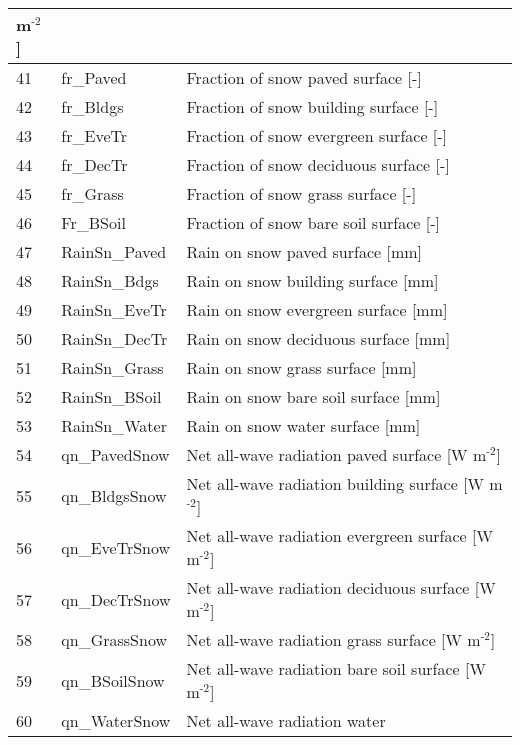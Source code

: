 \documentclass[letterpaper,10pt,english]{sphinxmanual}
\begin{document}
\begin{savenotes}
\begin{longtable}{|l|l|l|}
m$^{\text{-2}}${]}
\\
\hline
41
&
fr\_Paved
&
Fraction of snow \textendash{}
paved surface {[}-{]}
\\
\hline
42
&
fr\_Bldgs
&
Fraction of snow \textendash{}
building surface {[}-{]}
\\
\hline
43
&
fr\_EveTr
&
Fraction of snow \textendash{}
evergreen surface {[}-{]}
\\
\hline
44
&
fr\_DecTr
&
Fraction of snow \textendash{}
deciduous surface {[}-{]}
\\
\hline
45
&
fr\_Grass
&
Fraction of snow \textendash{}
grass surface {[}-{]}
\\
\hline
46
&
Fr\_BSoil
&
Fraction of snow \textendash{}
bare soil surface {[}-{]}
\\
\hline
47
&
RainSn\_Paved
&
Rain on snow \textendash{} paved
surface {[}mm{]}
\\
\hline
48
&
RainSn\_Bdgs
&
Rain on snow \textendash{}
building surface {[}mm{]}
\\
\hline
49
&
RainSn\_EveTr
&
Rain on snow \textendash{}
evergreen surface
{[}mm{]}
\\
\hline
50
&
RainSn\_DecTr
&
Rain on snow \textendash{}
deciduous surface
{[}mm{]}
\\
\hline
51
&
RainSn\_Grass
&
Rain on snow \textendash{} grass
surface {[}mm{]}
\\
\hline
52
&
RainSn\_BSoil
&
Rain on snow \textendash{} bare
soil surface {[}mm{]}
\\
\hline
53
&
RainSn\_Water
&
Rain on snow \textendash{} water
surface {[}mm{]}
\\
\hline
54
&
qn\_PavedSnow
&
Net all-wave
radiation \textendash{} paved
surface {[}W
m$^{\text{-2}}${]}
\\
\hline
55
&
qn\_BldgsSnow
&
Net all-wave
radiation \textendash{} building
surface {[}W
m$^{\text{-2}}${]}
\\
\hline
56
&
qn\_EveTrSnow
&
Net all-wave
radiation \textendash{} evergreen
surface {[}W
m$^{\text{-2}}${]}
\\
\hline
57
&
qn\_DecTrSnow
&
Net all-wave
radiation \textendash{} deciduous
surface {[}W
m$^{\text{-2}}${]}
\\
\hline
58
&
qn\_GrassSnow
&
Net all-wave
radiation \textendash{} grass
surface {[}W
m$^{\text{-2}}${]}
\\
\hline
59
&
qn\_BSoilSnow
&
Net all-wave
radiation \textendash{} bare soil
surface {[}W
m$^{\text{-2}}${]}
\\
\hline
60
&
qn\_WaterSnow
&
Net all-wave
radiation \textendash{} water

\end{longtable}
\end{savenotes}
\end{document}
